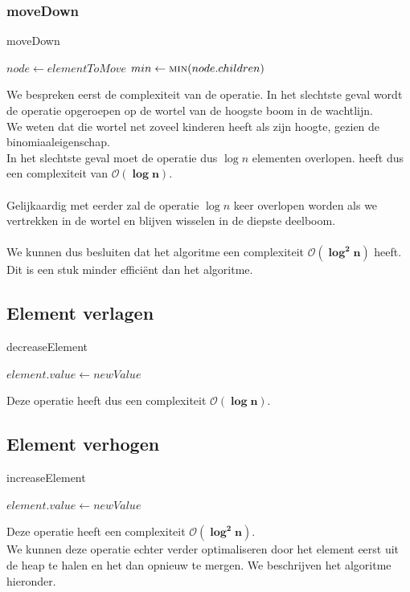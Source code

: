\documentclass[a4paper,12pt]{report}
\newcommand{\bigO}[1]{$\bm{\mathcal{O}(#1)}$} %
\begin{document}
\subsubsection{moveDown}
\begin{algorithm}[H]
\caption{moveDown}
\SetAlgoLined	
\DontPrintSemicolon
$node \gets elementToMove$\;
$min \gets \Call{min}{node.children}$\;
\;
\;
\end{algorithm}
We bespreken eerst de complexiteit van de  operatie. In het slechtste geval wordt de  operatie opgeroepen op de wortel van de hoogste boom in de wachtlijn. \\
We weten dat die wortel net zoveel kinderen heeft als zijn hoogte, gezien de binomiaaleigenschap. \\ In het slechtste geval moet de  operatie dus $\log n$ elementen overlopen.  heeft dus een complexiteit van \bigO{\log n}. \\ \\
Gelijkaardig met eerder zal de  operatie $\log n$ keer overlopen worden als we vertrekken in de wortel en blijven wisselen in de diepste deelboom. \\ \\
We kunnen dus besluiten dat het  algoritme een complexiteit \bigO{{\log}^2 n} heeft. \\
Dit is een stuk minder effici\"ent dan het  algoritme.

\subsection{Element verlagen}
\begin{algorithm}[H]
\caption{decreaseElement}
\SetAlgoLined	
\DontPrintSemicolon
$element.value \gets newValue$\;
\end{algorithm}
Deze operatie heeft dus een complexiteit \bigO{\log n}.

\subsection{Element verhogen}
\begin{algorithm}[H]
\caption{increaseElement}
\SetAlgoLined	
\DontPrintSemicolon
$element.value \gets newValue$\;
\;
\end{algorithm}
Deze operatie heeft een complexiteit \bigO{{\log}^2 n}. \\
We kunnen deze operatie echter verder optimaliseren door het element eerst uit de heap te halen en het dan opnieuw te mergen. We beschrijven het algoritme hieronder.
\end{document}
